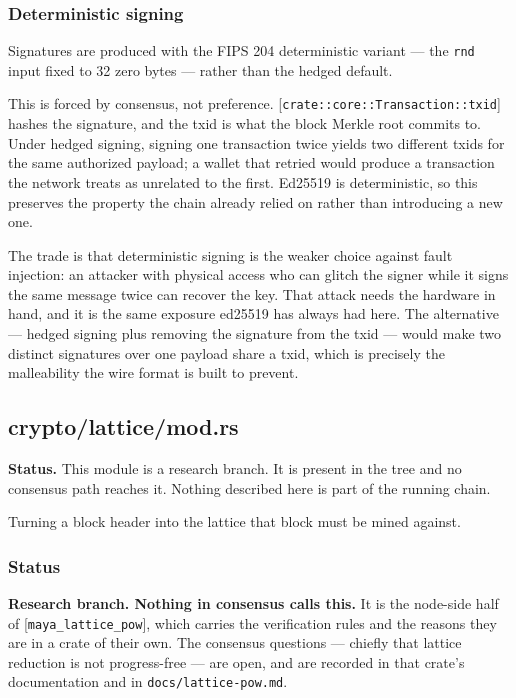 \documentclass[11pt,a4paper]{article}
\begin{document}
\subsubsection{Deterministic signing}

Signatures are produced with the FIPS 204 deterministic variant — the \texttt{rnd}
input fixed to 32 zero bytes — rather than the hedged default.

This is forced by consensus, not preference. [\texttt{crate::core::Transaction::txid}]
hashes the signature, and the txid is what the block Merkle root commits to.
Under hedged signing, signing one transaction twice yields two different
txids for the same authorized payload; a wallet that retried would produce a
transaction the network treats as unrelated to the first. Ed25519 is
deterministic, so this preserves the property the chain already relied on
rather than introducing a new one.

The trade is that deterministic signing is the weaker choice against fault
injection: an attacker with physical access who can glitch the signer while
it signs the same message twice can recover the key. That attack needs the
hardware in hand, and it is the same exposure ed25519 has always had here.
The alternative — hedged signing plus removing the signature from the txid —
would make two distinct signatures over one payload share a txid, which is
precisely the malleability the wire format is built to prevent.

\subsection{crypto/lattice/mod.rs}
\begin{framed}\noindent\textbf{Status.} This module is a research branch. It is present in the tree and no consensus path reaches it. Nothing described here is part of the running chain.\end{framed}

Turning a block header into the lattice that block must be mined against.

\subsubsection{Status}

\textbf{Research branch. Nothing in consensus calls this.} It is the node-side
half of [\texttt{maya\_lattice\_pow}], which carries the verification rules and the
reasons they are in a crate of their own. The consensus questions — chiefly
that lattice reduction is not progress-free — are open, and are recorded in
that crate's documentation and in \texttt{docs/lattice-pow.md}.
\end{document}
